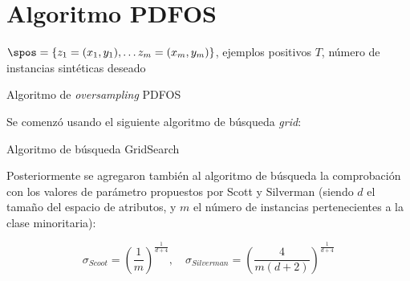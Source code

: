 \section{Algoritmo PDFOS}

\begin{algorithm}[H]
\begin{algorithmic}[1]
  \REQUIRE $\spos = \{z_1=(x_1, y_1), \ldots z_m=(x_m, y_m)\}$, ejemplos positivos
  \REQUIRE $T$, número de instancias sintéticas deseado
  \NEWLINE
  \ENDFOR
  \NEWLINE
\end{algorithmic}
\caption{Algoritmo de \textit{oversampling} PDFOS}
\label{alg:pdfos}
\end{algorithm}


Se comenzó usando el siguiente algoritmo de búsqueda \textit{grid}:

\begin{algorithm}[H]
\begin{algorithmic}[1]
    \ENDIF
  \ENDFOR
  \RETURN{$\sigma$}
\end{algorithmic}
\caption{Algoritmo de búsqueda GridSearch}
\end{algorithm}

Posteriormente se agregaron también al algoritmo de búsqueda la comprobación con los valores de parámetro propuestos por Scott
y Silverman (siendo $d$ el tamaño del espacio de atributos, y $m$ el número de instancias pertenecientes a la clase minoritaria):

\[\sigma_{Scoot} = \left(\frac{1}{m}\right)^{\frac{1}{d+4}}, \quad \sigma_{Silverman} = \left(\frac{4}{m(d+2)}\right)^{\frac{1}{d+4}}\]
